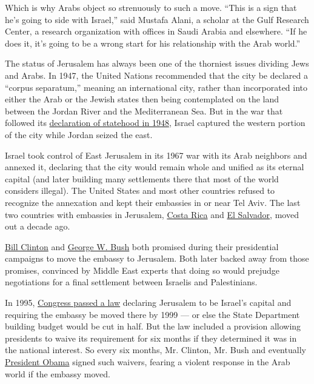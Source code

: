 Which is why Arabs object so strenuously to such a move. ``This is a
sign that he's going to side with Israel,'' said Mustafa Alani, a
scholar at the Gulf Research Center, a research organization with
offices in Saudi Arabia and elsewhere. ``If he does it, it's going to be
a wrong start for his relationship with the Arab world.''

The status of Jerusalem has always been one of the thorniest issues
dividing Jews and Arabs. In 1947, the United Nations recommended that
the city be declared a ``corpus separatum,'' meaning an international
city, rather than incorporated into either the Arab or the Jewish states
then being contemplated on the land between the Jordan River and the
Mediterranean Sea. But in the war that followed its
\href{http://learning.blogs.nytimes3xbfgragh.onion/2012/05/14/may-14-1948-israel-declares-independence/}{declaration
of statehood in 1948}, Israel captured the western portion of the city
while Jordan seized the east.

Israel took control of East Jerusalem in its 1967 war with its Arab
neighbors and annexed it, declaring that the city would remain whole and
unified as its eternal capital (and later building many settlements
there that most of the world considers illegal). The United States and
most other countries refused to recognize the annexation and kept their
embassies in or near Tel Aviv. The last two countries with embassies in
Jerusalem,
\href{http://www.nytimes3xbfgragh.onion/topic/destination/costa-rica}{Costa
Rica} and
\href{http://www.nytimes3xbfgragh.onion/topic/destination/el-salvador}{El
Salvador}, moved out a decade ago.

\href{http://www.nytimes3xbfgragh.onion/topic/person/bill-clinton}{Bill
Clinton} and
\href{http://www.nytimes3xbfgragh.onion/topic/person/george-w-bush}{George
W. Bush} both promised during their presidential campaigns to move the
embassy to Jerusalem. Both later backed away from those promises,
convinced by Middle East experts that doing so would prejudge
negotiations for a final settlement between Israelis and Palestinians.

In 1995,
\href{http://www.nytimes3xbfgragh.onion/1995/10/25/world/congress-backs-israel-embassy-switch-but-gives-clinton-an-out.html}{Congress
passed a law} declaring Jerusalem to be Israel's capital and requiring
the embassy be moved there by 1999 --- or else the State Department
building budget would be cut in half. But the law included a provision
allowing presidents to waive its requirement for six months if they
determined it was in the national interest. So every six months, Mr.
Clinton, Mr. Bush and eventually
\href{http://www.nytimes3xbfgragh.onion/topic/person/barack-obama?inline=nyt-per}{President
Obama} signed such waivers, fearing a violent response in the Arab world
if the embassy moved.

